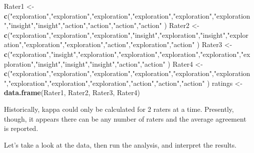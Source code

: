 \documentclass[
  english,
]{book}
\newenvironment{Shaded}{\begin{snugshade}}{\end{snugshade}}
\newcommand{\KeywordTok}[1]{\textcolor[rgb]{0.13,0.29,0.53}{\textbf{#1}}}
\newcommand{\NormalTok}[1]{#1}
\newcommand{\StringTok}[1]{\textcolor[rgb]{0.31,0.60,0.02}{#1}}
\begin{document}
\begin{Shaded}
\begin{Highlighting}[]
\NormalTok{Rater1 <-}\StringTok{ }\KeywordTok{c}\NormalTok{(}\StringTok{"exploration"}\NormalTok{,}\StringTok{"exploration"}\NormalTok{,}\StringTok{"exploration"}\NormalTok{,}\StringTok{"exploration"}\NormalTok{,}\StringTok{"exploration"}\NormalTok{,}\StringTok{"exploration"}\NormalTok{,}\StringTok{"insight"}\NormalTok{,}\StringTok{"insight"}\NormalTok{,}\StringTok{"action"}\NormalTok{,}\StringTok{"action"}\NormalTok{,}\StringTok{"action"}\NormalTok{,}\StringTok{"action"}\NormalTok{ )}
\NormalTok{Rater2 <-}\StringTok{ }\KeywordTok{c}\NormalTok{(}\StringTok{"exploration"}\NormalTok{,}\StringTok{"exploration"}\NormalTok{,}\StringTok{"exploration"}\NormalTok{,}\StringTok{"insight"}\NormalTok{,}\StringTok{"exploration"}\NormalTok{,}\StringTok{"insight"}\NormalTok{,}\StringTok{"exploration"}\NormalTok{,}\StringTok{"exploration"}\NormalTok{,}\StringTok{"exploration"}\NormalTok{,}\StringTok{"action"}\NormalTok{,}\StringTok{"exploration"}\NormalTok{,}\StringTok{"action"}\NormalTok{ )}
\NormalTok{Rater3 <-}\StringTok{ }\KeywordTok{c}\NormalTok{(}\StringTok{"exploration"}\NormalTok{,}\StringTok{"insight"}\NormalTok{,}\StringTok{"exploration"}\NormalTok{,}\StringTok{"exploration"}\NormalTok{,}\StringTok{"exploration"}\NormalTok{,}\StringTok{"exploration"}\NormalTok{,}\StringTok{"exploration"}\NormalTok{,}\StringTok{"insight"}\NormalTok{,}\StringTok{"insight"}\NormalTok{,}\StringTok{"insight"}\NormalTok{,}\StringTok{"action"}\NormalTok{,}\StringTok{"action"}\NormalTok{ )}
\NormalTok{Rater4 <-}\StringTok{ }\KeywordTok{c}\NormalTok{(}\StringTok{"exploration"}\NormalTok{,}\StringTok{"exploration"}\NormalTok{,}\StringTok{"exploration"}\NormalTok{,}\StringTok{"exploration"}\NormalTok{,}\StringTok{"exploration"}\NormalTok{,}\StringTok{"exploration"}\NormalTok{,}\StringTok{"exploration"}\NormalTok{,}\StringTok{"exploration"}\NormalTok{,}\StringTok{"exploration"}\NormalTok{,}\StringTok{"action"}\NormalTok{,}\StringTok{"action"}\NormalTok{,}\StringTok{"action"}\NormalTok{ )}
\NormalTok{ratings <-}\StringTok{ }\KeywordTok{data.frame}\NormalTok{(Rater1, Rater2, Rater3, Rater4)}
\end{Highlighting}
\end{Shaded}

Historically, kappa could only be calculated for 2 raters at a time. Presently, though, it appears there can be any number of raters and the average agreement is reported.

Let's take a look at the data, then run the analysis, and interpret the results.
\end{document}
